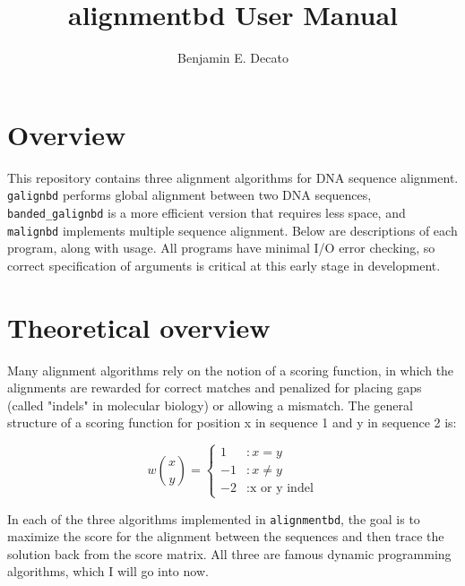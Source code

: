 \documentclass[11pt]{article}
\title{alignmentbd User Manual}
\author{Benjamin E. Decato}
\newcommand{\prog}[1]{\texttt{#1}}
\begin{document}
\maketitle

\tableofcontents
\newpage

\section{Overview}

This repository contains three alignment algorithms for DNA sequence
alignment. \prog{galignbd} performs global alignment between two DNA 
sequences, \prog{banded\_galignbd} is a more efficient version that requires
less space, and \prog{malignbd} implements multiple sequence alignment. Below
are descriptions of each program, along with usage. All programs have minimal
I/O error checking, so correct specification of arguments is critical at this
early stage in development.

\section{Theoretical overview}

Many alignment algorithms rely on the notion of a scoring function, in which
the alignments are rewarded for correct matches and penalized for placing
gaps (called "indels" in molecular biology) or allowing a mismatch. The general
structure of a scoring function for position x in sequence 1 and y in sequence
2 is:

\begin{displaymath}
w{x\choose y} = \left\{
  \begin{array}{lr}
    1 & : x = y\\
    -1 & : x \neq y\\
    -2 & : \text{x or y indel}
    \end{array}
    \right.
\end{displaymath}

In each of the three algorithms implemented in \prog{alignmentbd}, the goal is
to maximize the score for the alignment between the sequences and then trace
the solution back from the score matrix. All three are famous dynamic
programming algorithms, which I will go into now.
\end{document}
